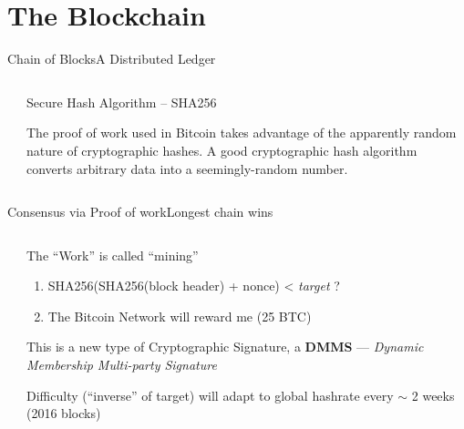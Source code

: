 \documentclass[english,compress]{beamer}
\begin{document}
\section{The Blockchain}

\begin{frame}{Chain of Blocks}{A Distributed Ledger}
\begin{columns}
 \begin{column}{0.3 \textwidth}
 \end{column}
 \begin{column}{0.6 \textwidth}
 \begin{exampleblock}{\begin{scriptsize}Secure Hash Algorithm -- SHA256\end{scriptsize}}
  \begin{tiny}The proof of work used in Bitcoin takes advantage of the apparently random 
 nature of cryptographic hashes. A good cryptographic
 hash algorithm converts arbitrary data into a seemingly-random number.
 \end{tiny}
 \end{exampleblock}
 \end{column}
 \hfill
\end{columns}
\end{frame}

\begin{frame}{Consensus via Proof of work}{Longest chain wins}
 \begin{columns}
  \begin{column}{0.5 \textwidth}
  \end{column}
  \begin{column}{0.4 \textwidth}
   \begin{exampleblock}{\begin{scriptsize}The ``Work'' is called ``mining'' \end{scriptsize}}
     \begin{scriptsize}
      \begin{enumerate}
       \item SHA256(SHA256(block header) + nonce) < \emph{target} ?
       \item The Bitcoin Network will reward me (25 BTC)
       \end{enumerate}
       \end{scriptsize}
\begin{tiny}
       This is a new type of Cryptographic Signature, a \textbf{DMMS} ---  \emph{Dynamic Membership Multi-party Signature}
     
     
       Difficulty (``inverse'' of target) will adapt to global hashrate
       every $\sim$ 2 weeks (2016 blocks)
      \end{tiny}


   \end{exampleblock}
   \vfill
  \end{column}
  \hfill
 \end{columns}
\end{frame}
\end{document}
